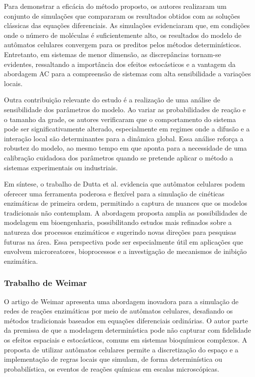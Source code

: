 \documentclass[12pt,oneside]{report}
\begin{document}
Para demonstrar a eficácia do método proposto, os autores realizaram um conjunto de simulações que compararam os resultados obtidos com as soluções clássicas das equações diferenciais. As simulações evidenciaram que, em condições onde o número de moléculas é suficientemente alto, os resultados do modelo de autômatos celulares convergem para os preditos pelos métodos determinísticos. Entretanto, em sistemas de menor dimensão, as discrepâncias tornam-se evidentes, ressaltando a importância dos efeitos estocásticos e a vantagem da abordagem AC para a compreensão de sistemas com alta sensibilidade a variações locais.

Outra contribuição relevante do estudo é a realização de uma análise de sensibilidade dos parâmetros do modelo. Ao variar as probabilidades de reação e o tamanho da grade, os autores verificaram que o comportamento do sistema pode ser significativamente alterado, especialmente em regimes onde a difusão e a interação local são determinantes para a dinâmica global. Essa análise reforça a robustez do modelo, ao mesmo tempo em que aponta para a necessidade de uma calibração cuidadosa dos parâmetros quando se pretende aplicar o método a sistemas experimentais ou industriais.

Em síntese, o trabalho de Dutta et al. \cite{dutta2015generalized} evidencia que autômatos celulares podem oferecer uma ferramenta poderosa e flexível para a simulação de cinéticas enzimáticas de primeira ordem, permitindo a captura de nuances que os modelos tradicionais não contemplam. A abordagem proposta amplia as possibilidades de modelagem em bioengenharia, possibilitando estudos mais refinados sobre a natureza dos processos enzimáticos e sugerindo novas direções para pesquisas futuras na área. Essa perspectiva pode ser especialmente útil em aplicações que envolvem microreatores, bioprocessos e a investigação de mecanismos de inibição enzimática.

\subsubsection{Trabalho de Weimar}

O artigo de Weimar \cite{weimar2002cellular} apresenta uma abordagem inovadora para a simulação de redes de reações enzimáticas por meio de autômatos celulares, desafiando os métodos tradicionais baseados em equações diferenciais ordinárias. O autor parte da premissa de que a modelagem determinística pode não capturar com fidelidade os efeitos espaciais e estocásticos, comuns em sistemas bioquímicos complexos. A proposta de utilizar autômatos celulares permite a discretização do espaço e a implementação de regras locais que simulam, de forma determinística ou probabilística, os eventos de reações químicas em escalas microscópicas.
\end{document}
